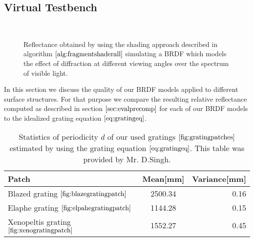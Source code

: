 \subsection{Virtual Testbench}

\begin{figure}[H]
  \centering
~
~

\caption[Validation of FLSS Approach applied on our Gratings]{Reflectance obtained by using the shading approach described in algorithm $\ref{alg:fragmentshaderall}$ simulating a BRDF which models the effect of diffraction at different viewing angles over the spectrum of visible light.}
\label{fig:evaluationdiffshaderalllambda}
\end{figure}

In this section we discuss the quality of our BRDF models applied to different surface structures. For that purpose we compare the resulting relative reflectance computed as described in section $\ref{sec:evalprecomp}$ for each of our BRDF models to the idealized grating equation $\ref{eq:gratingeq}$. 

\begin{table}[H]
  \centering
  \begin{tabular}{| l | c | r |}
    \hline                       
    Patch & Mean[mm] & Variance[mm] \\
    \hline
    Blazed grating $\ref{fig:blazegratingpatch}$ & 2500.34 & 0.16 \\
    Elaphe grating $\ref{fig:elpahegratingpatch}$ & 1144.28 & 0.15 \\
    Xenopeltis grating $\ref{fig:xenogratingpatch}$ & 1552.27 & 0.45 \\
    \hline  
  \end{tabular}
\caption[Estimated Grating Spacings]{Statistics of periodicity $d$ of our used gratings $\ref{fig:gratingpatches}$ estimated by using the grating equation $\ref{eq:gratingeq}$. This table was provided by Mr. D.Singh.}
\label{tab:gratingsmeanvariance}
\end{table}

